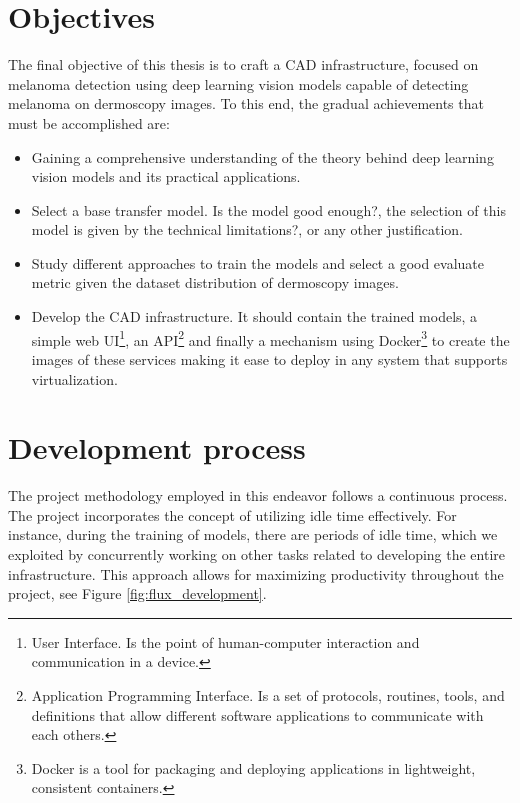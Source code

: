 \newpage

\section{Objectives}

The final objective of this thesis is to craft a CAD infrastructure, focused on
melanoma detection using deep learning vision models capable of detecting
melanoma on dermoscopy images. To this end, the gradual achievements that must
be accomplished are:

\begin{itemize}

  \item Gaining a comprehensive understanding of the theory behind deep
    learning vision models and its practical applications.

   \item Select a base transfer model. Is the model good enough?, the selection
     of this model is given by the technical limitations?, or any other
     justification.

  \item Study different approaches to train the models and select a good
    evaluate metric given the dataset distribution of dermoscopy images.

  \item  Develop the CAD infrastructure. It should contain the  trained models,
    a simple web UI\footnote{User Interface. Is the point of human-computer
    interaction and communication in a device.}, an API\footnote{Application
      Programming Interface. Is a set of protocols, routines, tools, and
    definitions that allow different software applications to communicate with
  each others.} and finally a mechanism using Docker\footnote{Docker is a tool
  for packaging and deploying applications in lightweight, consistent
containers.} to create the images of these services making it ease to deploy in
any system that supports virtualization.

\end{itemize}


\section{Development process}

The project methodology employed in this endeavor follows a continuous process.
The project incorporates the concept of utilizing idle time effectively. For
instance, during the training of models, there are periods of idle time, which
we exploited by concurrently working on other tasks related to developing the
entire infrastructure. This approach allows for maximizing productivity
throughout the project, see Figure \ref{fig:flux_development}.

